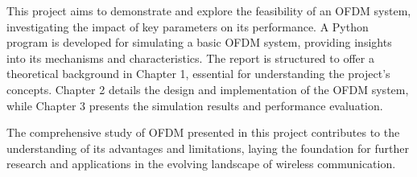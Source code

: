 This project aims to demonstrate and explore the feasibility of an OFDM system, investigating the impact of key parameters on its performance. A Python program is developed for simulating a basic OFDM system, providing insights into its mechanisms and characteristics. The report is structured to offer a theoretical background in Chapter 1, essential for understanding the project's concepts. Chapter 2 details the design and implementation of the OFDM system, while Chapter 3 presents the simulation results and performance evaluation.

The comprehensive study of OFDM presented in this project contributes to the understanding of its advantages and limitations, laying the foundation for further research and applications in the evolving landscape of wireless communication.
\newpage
\cleardoublepage